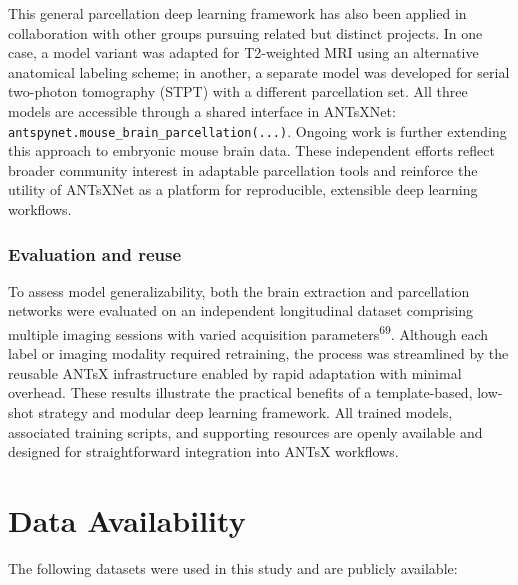 \documentclass[
  12pt,
]{article}
\begin{document}
This general parcellation deep learning framework has also been applied
in collaboration with other groups pursuing related but distinct
projects. In one case, a model variant was adapted for T2-weighted MRI
using an alternative anatomical labeling scheme; in another, a separate
model was developed for serial two-photon tomography (STPT) with a
different parcellation set. All three models are accessible through a
shared interface in ANTsXNet:
\texttt{antspynet.mouse\_brain\_parcellation(...)}. Ongoing work is
further extending this approach to embryonic mouse brain data. These
independent efforts reflect broader community interest in adaptable
parcellation tools and reinforce the utility of ANTsXNet as a platform
for reproducible, extensible deep learning workflows.

\subsubsection{Evaluation and reuse}\label{evaluation-and-reuse}

To assess model generalizability, both the brain extraction and
parcellation networks were evaluated on an independent longitudinal
dataset comprising multiple imaging sessions with varied acquisition
parameters\textsuperscript{69}. Although each label or imaging modality
required retraining, the process was streamlined by the reusable ANTsX
infrastructure enabled by rapid adaptation with minimal overhead. These
results illustrate the practical benefits of a template-based, low-shot
strategy and modular deep learning framework. All trained models,
associated training scripts, and supporting resources are openly
available and designed for straightforward integration into ANTsX
workflows.

\clearpage

\section*{Data Availability}\label{data-availability}

The following datasets were used in this study and are publicly
available:
\end{document}
